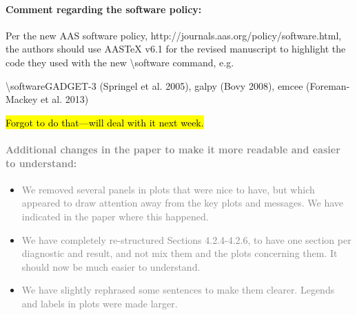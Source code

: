 \documentclass[10pt,a4paper]{article}
\newcommand{\Answer}[1]{\textcolor{Gray}{#1}}
\begin{document}
\paragraph{Comment regarding the software policy:}

Per the new AAS software policy, http://journals.aas.org/policy/software.html, the
authors should use AASTeX v6.1 for the revised manuscript to highlight the code they
used with the new {\textbackslash}software command, e.g.

{\textbackslash}software{GADGET-3 (Springel et al. 2005), galpy (Bovy 2008), emcee (Foreman-Mackey
et al. 2013)}

\hl{Forgot to do that---will deal with it next week.}

\paragraph{\Answer{Additional changes in the paper to make it more readable and easier to understand:}}
\begin{itemize}
\item \Answer{We removed several panels in plots that were nice to have, but which appeared to draw attention away from the key plots and messages. We have indicated in the paper where this happened.}
\item \Answer{We have completely re-structured Sections 4.2.4-4.2.6, to have one section per diagnostic and result, and not mix them and the plots concerning them. It should now be much easier to understand.}
\item \Answer{We have slightly rephrased some sentences to make them clearer. Legends and labels in plots were made larger.}
\end{itemize}
\end{document}
